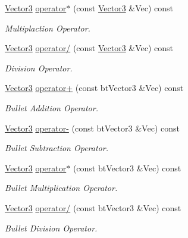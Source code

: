 \begin{DoxyCompactItemize}
\hyperlink{classphys_1_1Vector3}{Vector3} \hyperlink{classphys_1_1Vector3_a19eef355e6376acfb1d631aab63fdea5}{operator$\ast$} (const \hyperlink{classphys_1_1Vector3}{Vector3} \&Vec) const 
\begin{DoxyCompactList}\small\item\em Multiplaction Operator. \item\end{DoxyCompactList}\item 
\hyperlink{classphys_1_1Vector3}{Vector3} \hyperlink{classphys_1_1Vector3_a75bb5dd58d66a039a1a651398417110f}{operator/} (const \hyperlink{classphys_1_1Vector3}{Vector3} \&Vec) const 
\begin{DoxyCompactList}\small\item\em Division Operator. \item\end{DoxyCompactList}\item 
\hyperlink{classphys_1_1Vector3}{Vector3} \hyperlink{classphys_1_1Vector3_a88fd674d6a8eaf2d256bdd10f7f8d05a}{operator+} (const btVector3 \&Vec) const 
\begin{DoxyCompactList}\small\item\em Bullet Addition Operator. \item\end{DoxyCompactList}\item 
\hyperlink{classphys_1_1Vector3}{Vector3} \hyperlink{classphys_1_1Vector3_affbba2c1aa5dd5cd788f4f7e440cd52e}{operator-\/} (const btVector3 \&Vec) const 
\begin{DoxyCompactList}\small\item\em Bullet Subtraction Operator. \item\end{DoxyCompactList}\item 
\hyperlink{classphys_1_1Vector3}{Vector3} \hyperlink{classphys_1_1Vector3_ac9b49852c6bd2fa2b81f4972d7761697}{operator$\ast$} (const btVector3 \&Vec) const 
\begin{DoxyCompactList}\small\item\em Bullet Multiplication Operator. \item\end{DoxyCompactList}\item 
\hyperlink{classphys_1_1Vector3}{Vector3} \hyperlink{classphys_1_1Vector3_a998a6b51433f43ac8b9434279137a1dd}{operator/} (const btVector3 \&Vec) const 
\begin{DoxyCompactList}\small\item\em Bullet Division Operator. \item\end{DoxyCompactList}\item 

\end{DoxyCompactItemize}
